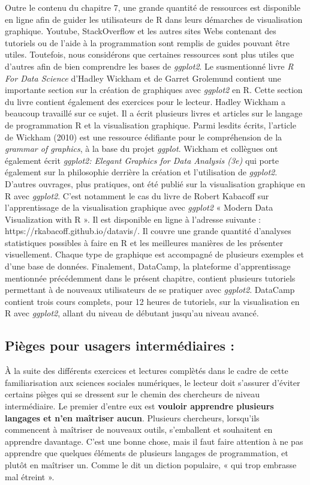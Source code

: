 \documentclass[
  letterpaper,
  DIV=11,
  numbers=noendperiod]{scrreprt}
\begin{document}
Outre le contenu du chapitre 7, une grande quantité de ressources est
disponible en ligne afin de guider les utilisateurs de R dans leurs
démarches de visualisation graphique. Youtube, StackOverflow et les
autres sites Webs contenant des tutoriels ou de l'aide à la
programmation sont remplis de guides pouvant être utiles. Toutefois,
nous considérons que certaines ressources sont plus utiles que d'autres
afin de bien comprendre les bases de \emph{ggplot2}. Le susmentionné
livre \emph{R For Data Science} d'Hadley Wickham et de Garret Grolemund
contient une importante section sur la création de graphiques avec
\emph{ggplot2} en R. Cette section du livre contient également des
exercices pour le lecteur. Hadley Wickham a beaucoup travaillé sur ce
sujet. Il a écrit plusieurs livres et articles sur le langage de
programmation R et la visualisation graphique. Parmi lesdits écrits,
l'article de Wickham (2010) est une ressource édifiante pour le
compréhension de la \emph{grammar of graphics}, à la base du projet
\emph{ggplot}. Wickham et collègues ont également écrit \emph{ggplot2:
Elegant Graphics for Data Analysis (3e)} qui porte également sur la
philosophie derrière la création et l'utilisation de \emph{ggplot2}.
D'autres ouvrages, plus pratiques, ont été publié sur la visualisation
graphique en R avec \emph{ggplot2}. C'est notamment le cas du livre de
Robert Kabacoff sur l'apprentissage de la visualisation graphique avec
\emph{ggplot2} « Modern Data Visualization with R ». Il est disponible
en ligne à l'adresse suivante : https://rkabacoff.github.io/datavis/. Il
couvre une grande quantité d'analyses statistiques possibles à faire en
R et les meilleures manières de les présenter visuellement. Chaque type
de graphique est accompagné de plusieurs exemples et d'une base de
données. Finalement, DataCamp, la plateforme d'apprentissage mentionnée
précédemment dans le présent chapitre, contient plusieurs tutoriels
permettant à de nouveaux utilisateurs de se pratiquer avec
\emph{ggplot2}. DataCamp contient trois cours complets, pour 12 heures
de tutoriels, sur la visualisation en R avec \emph{ggplot2}, allant du
niveau de débutant jusqu'au niveau avancé.

\subsection{Pièges pour usagers intermédiaires
:}\label{piuxe8ges-pour-usagers-intermuxe9diaires}

À la suite des différents exercices et lectures complètés dans le cadre
de cette familiarisation aux sciences sociales numériques, le lecteur
doit s'assurer d'éviter certains pièges qui se dressent sur le chemin
des chercheurs de niveau intermédiaire. Le premier d'entre eux est
\textbf{vouloir apprendre plusieurs langages et n'en maîtriser aucun}.
Plusieurs chercheurs, lorsqu'ils commencent à maîtriser de nouveaux
outils, s'emballent et souhaitent en apprendre davantage. C'est une
bonne chose, mais il faut faire attention à ne pas apprendre que
quelques éléments de plusieurs langages de programmation, et plutôt en
maîtriser un. Comme le dit un diction populaire, « qui trop embrasse mal
étreint ».
\end{document}
